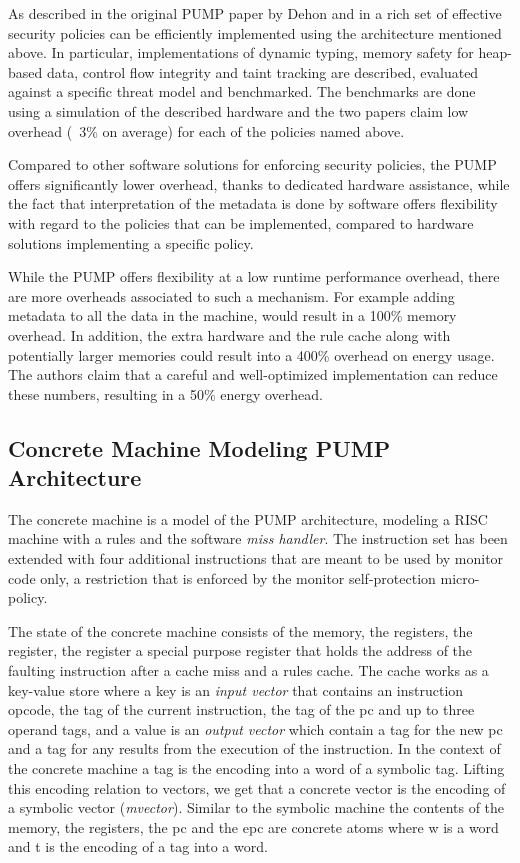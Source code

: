 As described in the original PUMP paper by Dehon \ETAL
\cite{pump_hasp2014} and in \cite{pump_asplos2015} a rich set of
effective security policies can be efficiently implemented using the
architecture mentioned above. In particular, implementations of
dynamic typing, memory safety for heap-based data, control flow
integrity and taint tracking are described, evaluated against a
specific threat model and benchmarked. The benchmarks are done using a
simulation of the described hardware and the two papers claim low
overhead (~3\% on average) for each of the policies named above.

Compared to other software solutions for enforcing security policies, the PUMP
offers significantly lower overhead, thanks to dedicated hardware assistance,
while the fact that interpretation of the metadata is done by software offers
flexibility with regard to the policies that can be implemented, compared to
hardware solutions implementing a specific policy.

While the PUMP offers flexibility at a low runtime performance
overhead, there are more overheads associated to such a mechanism. For
example adding metadata to all the data in the machine, would result
in a 100\% memory overhead.  In addition, the extra hardware and the
rule cache along with potentially larger memories could result into a
400\% overhead on energy usage. \cite{pump_asplos2015} The authors
claim that a careful and well-optimized implementation can reduce
these numbers, resulting in a 50\% energy overhead.
%

\subsection{Concrete Machine Modeling PUMP Architecture}\label{sec:concrete}

The concrete machine is a model of the PUMP architecture, modeling a
RISC machine with a rules \cache and the software \emph{miss handler}.
The instruction set has been extended with four additional
instructions that are meant to be used by monitor code only, a
restriction that is enforced by the monitor self-protection
micro-policy.

The state of the concrete machine consists of the memory, the
registers, the \pc register, the \epc register a special purpose
register that holds the address of the faulting instruction after a
cache miss and a rules cache. The cache works as a key-value store
where a key is an \emph{input vector} that contains an instruction
opcode, the tag of the current instruction, the tag of the pc and up
to three operand tags, and a value is an \emph{output vector} which
contain a tag for the new pc and a tag for any results from the
execution of the instruction. In the context of the concrete machine a
tag is the encoding into a word of a symbolic tag. Lifting this
encoding relation to vectors, we get that a concrete vector is the
encoding of a symbolic vector (\emph{mvector}). Similar to the
symbolic machine the contents of the memory, the registers, the pc and
the epc are concrete atoms  where w is a word and t is the
encoding of a tag into a word.

